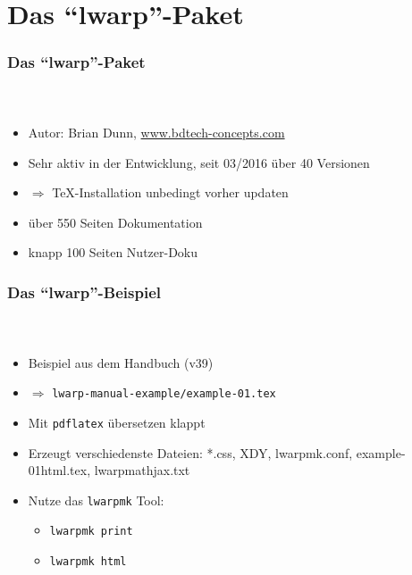 \documentclass[12pt,ngerman]{beamer}
\begin{document}
\section{Das \enquote{lwarp}-Paket}

\begin{frame}
\frametitle{Das \enquote{lwarp}-Paket}
\framesubtitle{~}

\begin{itemize}
\item Autor: Brian Dunn, \url{www.bdtech-concepts.com}
\item Sehr aktiv in der Entwicklung, seit 03/2016 über 40 Versionen
\item $\Rightarrow$ \TeX-Installation unbedingt vorher updaten
\item über 550 Seiten Dokumentation
\item  knapp 100 Seiten Nutzer-Doku
\end{itemize}

\end{frame}

\begin{frame}
\frametitle{Das \enquote{lwarp}-Beispiel}
\framesubtitle{~}

\begin{itemize}
\item Beispiel aus dem Handbuch (v39)
\item $\Rightarrow$ \texttt{lwarp-manual-example/example-01.tex}
\item Mit \texttt{pdflatex} übersetzen klappt 
\item Erzeugt verschiedenste Dateien: *.css, XDY, lwarpmk.conf, example-01\textunderscore html.tex, lwarp\textunderscore  mathjax.txt
\item Nutze das \texttt{lwarpmk} Tool:
\begin{itemize}
	\item \texttt{lwarpmk print}
	\item \texttt{lwarpmk html}
	\end{itemize}
\end{itemize}
\end{frame}
\end{document}
